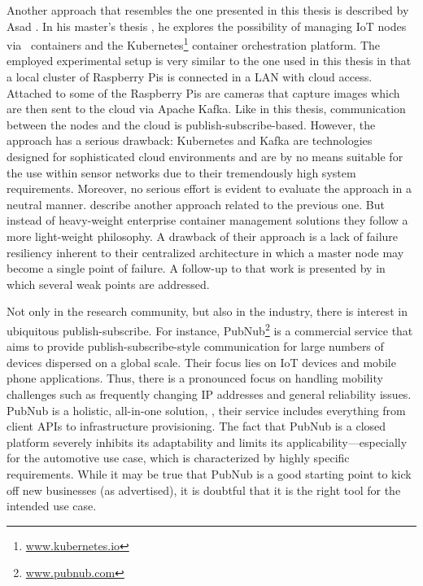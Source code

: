 Another approach that resembles the one presented in this thesis is described by Asad \citeauthor*{javed2016container}. In his master's thesis \cite{javed2016container}, he explores the possibility of managing IoT nodes via \docker\ containers and the Kubernetes\footnote{\url{www.kubernetes.io}} container orchestration platform. The employed experimental setup is very similar to the one used in this thesis in that a local cluster of Raspberry Pis is connected in a LAN with cloud access. Attached to some of the Raspberry Pis are cameras that capture images which are then sent to the cloud via Apache Kafka. Like in this thesis, communication between the nodes and the cloud is publish-subscribe-based. However, the approach has a serious drawback: Kubernetes and Kafka are technologies designed for sophisticated cloud environments and are by no means suitable for the use within sensor networks due to their tremendously high system requirements. Moreover, no serious effort is evident to evaluate the approach in a neutral manner.
\citeauthor*{grossmann2016hypriot} \cite{grossmann2016hypriot} describe another approach related to the previous one. But instead of heavy-weight enterprise container management solutions they follow a more light-weight philosophy. A drawback of their approach is a lack of failure resiliency inherent to their centralized architecture in which a master node may become a single point of failure. A follow-up to that work is presented by \citeauthor*{celesti2017watchdog} \cite{celesti2017watchdog} in which several weak points are addressed.

Not only in the research community, but also in the industry, there is interest in ubiquitous publish-subscribe. 
For instance, PubNub\footnote{\url{www.pubnub.com}} is a commercial service that aims to provide publish-subscribe-style communication for large numbers of devices dispersed on a global scale. Their focus lies on IoT devices and mobile phone applications. Thus, there is a pronounced focus on handling mobility challenges such as frequently changing IP addresses and general reliability issues. PubNub is a holistic, all-in-one solution, \ie , their service includes everything from client APIs to infrastructure provisioning. The fact that \mbox{PubNub} is a closed platform severely inhibits its adaptability and limits its applicability---especially for the automotive use case, which is characterized by highly specific requirements. While it may be true that PubNub is a good starting point to kick off new businesses (as advertised), it is doubtful that it is the right tool for the intended use case.

